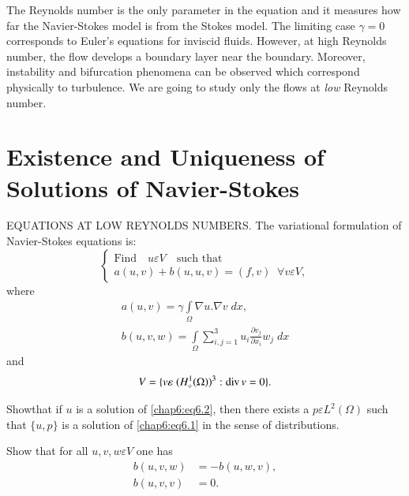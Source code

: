 The Reynolds number is the only parameter in the equation and it
measures how far the Navier-Stokes model is from the Stokes model. The
limiting case $\gamma =0$ corresponds to Euler's equations for
inviscid fluids. However, at high Reynolds number, the flow develops a
boundary layer near the boundary. Moreover, instability and
bifurcation phenomena can be observed which correspond physically to
turbulence. We are going to study only the flows at \emph{low}
Reynolds number.

\section[Existence and Uniqueness of Solutions of...]{Existence and
  Uniqueness of Solutions of\hfil\break 
  Navier-Stokes}\label{chap6:ssec6.7}  

EQUATIONS AT LOW REYNOLDS NUMBERS. The variational formulation of
Navier-Stokes equations is:
\begin{equation}\label{chap6:eq6.2}
\begin{cases}
\text{Find}\quad u\varepsilon V\quad\text{such that}\\
a(u, v)+b(u, u, v)=(f, v)\; \; \forall v\varepsilon V,
\end{cases}
\end{equation}
where
\begin{equation*}
\begin{split}
a(u, v)=\gamma\int\limits_\Omega\nabla u.\nabla v\; dx,\\
b(u, v, w)=\int\limits_\Omega\sum\limits_{i,j=1}^3 u_i \frac{\partial
v_j}{\partial x_i}w_j\; dx
\end{split}
\end{equation*}
and
$$
V=\{v\varepsilon \;(H_\circ^1(\Omega))^3:\operatorname{div} v=0\}.
$$

\begin{exercise}\label{chap6:exr3}
Show\pageoriginale that if $u$ is a solution of \eqref{chap6:eq6.2},
then there exists a $p\varepsilon L^2(\Omega)$ such that $\{u,p\}$ is
a solution of \eqref{chap6:eq6.1} in the sense of distributions. 
\end{exercise}

\begin{exercise}\label{chap6:exr4}
Show that for all $u, v, w \varepsilon V$ one has 
\begin{align*}
b(u, v, w) &= -b(u, w, v),\\
b(u, v, v) &= 0.
\end{align*}
\end{exercise}

